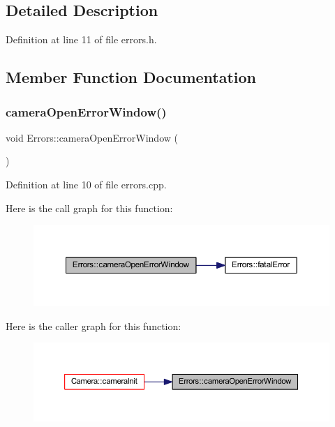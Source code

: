 \subsection{Detailed Description}


Definition at line 11 of file errors.\+h.



\subsection{Member Function Documentation}
\mbox{\label{class_errors_ac17ec34c73179504a0ba63271a005d0a}} 
\subsubsection{\texorpdfstring{cameraOpenErrorWindow()}{cameraOpenErrorWindow()}}
{\footnotesize\ttfamily void Errors\+::camera\+Open\+Error\+Window (\begin{DoxyParamCaption}{ }\end{DoxyParamCaption})\hspace{0.3cm}{\ttfamily [static]}}



Definition at line 10 of file errors.\+cpp.

Here is the call graph for this function\+:\nopagebreak
\begin{figure}[H]
\begin{center}
\leavevmode
\includegraphics[width=350pt]{class_errors_ac17ec34c73179504a0ba63271a005d0a_cgraph}
\end{center}
\end{figure}
Here is the caller graph for this function\+:\nopagebreak
\begin{figure}[H]
\begin{center}
\leavevmode
\includegraphics[width=350pt]{class_errors_ac17ec34c73179504a0ba63271a005d0a_icgraph}
\end{center}
\end{figure}
\mbox{\label{class_errors_a988959b35354c727ebe2fd884ee34bae}} 
